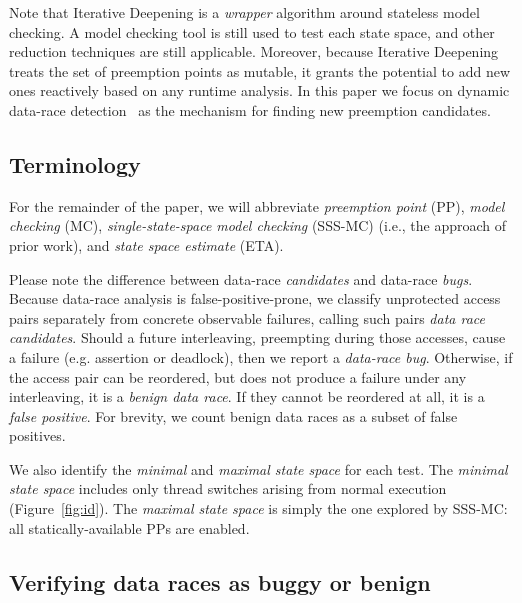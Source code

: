 Note that Iterative Deepening is a {\em wrapper} algorithm around stateless model checking.
A model checking tool is still used to test each state space, and other reduction techniques are still applicable.
Moreover, because Iterative Deepening treats the set of preemption points as mutable,
it grants the potential to add new ones reactively based on any runtime analysis.
In this paper we focus on dynamic data-race detection~\cite{tsan} as the mechanism for finding new preemption candidates.

\subsection{Terminology}

For the remainder of the paper, we will abbreviate {\em preemption point} (PP),
{\em model checking} (MC),
{\em single-state-space model checking} (SSS-MC) (i.e., the approach of prior work),
and {\em state space estimate} (ETA).

Please note the difference between data-race {\em candidates} and data-race {\em bugs}.
Because data-race analysis is false-positive-prone,
we classify unprotected access pairs separately from concrete observable failures, %
calling such pairs {\em data race candidates}.
Should a future interleaving, preempting during those accesses, cause a failure (e.g. assertion or deadlock), then we report a {\em data-race bug}.
Otherwise, if the access pair can be reordered, but does not produce a failure under any interleaving, it is a {\em benign data race}.
If they cannot be reordered at all, it is a {\em false positive}.
For brevity, we count benign data races as a subset of false positives.

We also identify the {\em minimal} and {\em maximal state space} for each test.
The {\em minimal state space} includes only thread switches arising from normal execution (Figure~\ref{fig:id}).
The {\em maximal state space} is simply the one explored by SSS-MC: all statically-available PPs are enabled.

\subsection{Verifying data races as buggy or benign} %

